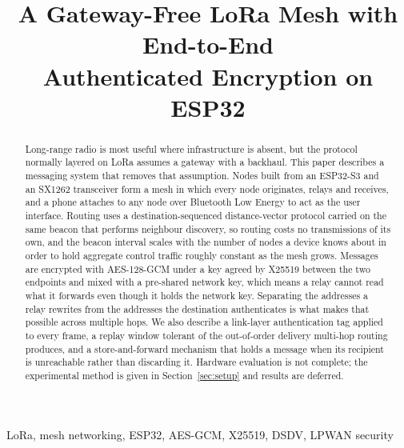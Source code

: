 \documentclass[conference]{IEEEtran}
\begin{document}
\title{A Gateway-Free LoRa Mesh with End-to-End\\Authenticated Encryption on ESP32}

\author{
}

\maketitle

\begin{abstract}
Long-range radio is most useful where infrastructure is absent, but the protocol
normally layered on LoRa assumes a gateway with a backhaul. This paper describes
a messaging system that removes that assumption. Nodes built from an ESP32-S3 and
an SX1262 transceiver form a mesh in which every node originates, relays and
receives, and a phone attaches to any node over Bluetooth Low Energy to act as
the user interface. Routing uses a destination-sequenced distance-vector protocol
carried on the same beacon that performs neighbour discovery, so routing costs no
transmissions of its own, and the beacon interval scales with the number of nodes
a device knows about in order to hold aggregate control traffic roughly constant
as the mesh grows. Messages are encrypted with AES-128-GCM under a key agreed by
X25519 between the two endpoints and mixed with a pre-shared network key, which
means a relay cannot read what it forwards even though it holds the network key.
Separating the addresses a relay rewrites from the addresses the destination
authenticates is what makes that possible across multiple hops. We also describe
a link-layer authentication tag applied to every frame, a replay window tolerant
of the out-of-order delivery multi-hop routing produces, and a store-and-forward
mechanism that holds a message when its recipient is unreachable rather than
discarding it. Hardware evaluation is not complete; the experimental method is
given in Section~\ref{sec:setup} and results are deferred.
\end{abstract}

\begin{IEEEkeywords}
LoRa, mesh networking, ESP32, AES-GCM, X25519, DSDV, LPWAN security
\end{IEEEkeywords}

\end{document}
